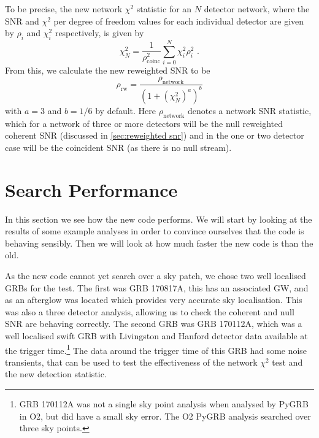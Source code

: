 \documentclass[11pt]{cuthesis}
\newcommand{\fs}{\text{ .}}
\begin{document}
To be precise, the new network $\chi^2$ statistic for an $N$ detector network, where the SNR and $\chi^2$ per degree of freedom values for each individual detector are given by $\rho_i$ and $\chi^2_i$ respectively, is given by
\begin{equation}
\chi^2_N = \frac{ 1 }{\rho_\text{coinc}^2} \sum_{i=0}^N \chi^2_i \rho^2_i \fs
\end{equation}
From this, we calculate the new reweighted SNR to be
\begin{equation}
\rho_\text{rw} = \frac{\rho_\text{network}}{(1+(\chi^2_N)^a)^b}
\end{equation}
with $a=3$ and $b=1/6$ by default. Here $\rho_\text{network}$ denotes a network SNR statistic, which for a network of three or more detectors will be the null reweighted coherent SNR (discussed in \ref{sec:reweighted snr}) and in the one or two detector case will be the coincident SNR (as there is no null stream). 


\FloatBarrier
\section{Search Performance}
In this section we see how the new code performs. We will start by looking at the results of some example analyses in order to convince ourselves that the code is behaving sensibly. Then we will look at how much faster the new code is than the old. 

As the new code cannot yet search over a sky patch, we chose two well localised GRBs for the test. The first was GRB 170817A, this has an associated GW, and as an afterglow was located which provides very accurate sky localisation. This was also a three detector analysis, allowing us to check the coherent and null SNR are behaving correctly. The second GRB was GRB 170112A, which was a well localised swift GRB with Livingston and Hanford detector data available at the trigger time.\footnote{GRB 170112A was not a single sky point analysis when analysed by PyGRB in O2, but did have a small sky error. The O2 PyGRB analysis searched over three sky points.} The data around the trigger time of this GRB had some noise transients, that can be used to test the effectiveness of the network $\chi^2$ test and the new detection statistic.
\end{document}
